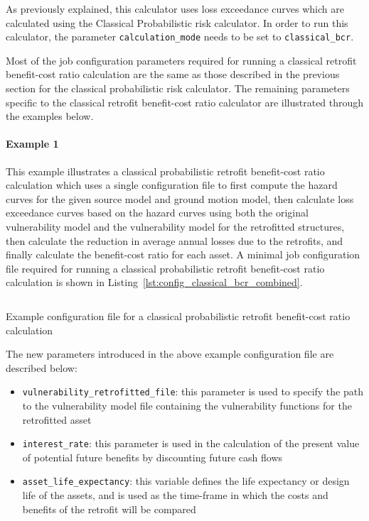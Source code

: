 As previously explained, this calculator uses loss exceedance curves which are
calculated using the Classical Probabilistic risk calculator. In order to run
this calculator, the parameter \Verb+calculation_mode+ needs to be set to
\Verb+classical_bcr+.

Most of the job configuration parameters required for running a classical
retrofit benefit-cost ratio calculation are the same as those described in the
previous section for the classical probabilistic risk calculator. The
remaining parameters specific to the classical retrofit benefit-cost ratio
calculator are illustrated through the examples below.

\paragraph{Example 1}

This example illustrates a classical probabilistic retrofit benefit-cost ratio
calculation which uses a single configuration file to first compute the hazard
curves for the given source model and ground motion model, then calculate loss
exceedance curves based on the hazard curves using both the original
vulnerability model and the vulnerability model for the retrofitted
structures, then calculate the reduction in average annual losses due to the
retrofits, and finally calculate the benefit-cost ratio for each asset. A
minimal job configuration file required for running a classical probabilistic
retrofit benefit-cost ratio calculation is shown in
Listing~\ref{lst:config_classical_bcr_combined}.

\begin{listing}[htbp]
  \inputminted[firstline=1,firstnumber=1,fontsize=\footnotesize,frame=single,linenos,bgcolor=lightgray,label=job.ini]{ini}{oqum/risk/verbatim/config_classical_bcr_combined.ini}
  \caption{Example configuration file for a classical probabilistic retrofit benefit-cost ratio calculation}
  \label{lst:config_classical_bcr_combined}
\end{listing}

The new parameters introduced in the above example configuration file are
described below:

\begin{itemize}

  \item \Verb+vulnerability_retrofitted_file+: this parameter is used to
    specify the path to the \gls{vulnerability model} file containing the
    \glspl{vulnerability function} for the retrofitted asset

  \item \Verb+interest_rate+: this parameter is used in the calculation of the
    present value of potential future benefits by discounting future cash flows

  \item \Verb+asset_life_expectancy+: this variable defines the life
    expectancy or design life of the assets, and is used as the time-frame in
    which the costs and benefits of the retrofit will be compared

\end{itemize}

